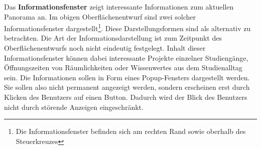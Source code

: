 Das \textbf{Informationsfenster} zeigt interessante Informationen zum aktuellen
Panorama an. Im obigen Oberflächenentwurf sind zwei solcher Informationsfenster
dargestellt\footnote{Die Informationsfenster befinden sich am rechten Rand
sowie oberhalb des Steuerkreuzes}. Diese Darstellungsformen sind als alternativ
zu betrachten. Die Art der Informationsdarstellung ist zum Zeitpunkt des
Oberflächenentwurfs noch nicht eindeutig festgelegt. Inhalt dieser
Informationsfenster können dabei interessante Projekte einzelner Studiengänge,
Öffnungszeiten von Räumlichkeiten oder Wissenwertes aus dem Studienalltag sein.
Die Informationen sollen in Form eines Popup-Fensters dargestellt werden. Sie
sollen also nicht permanent angezeigt werden, sondern erscheinen erst durch
Klicken des Benutzers auf einen Button. Dadurch wird der Blick des Benutzers
nicht durch störende Anzeigen eingeschränkt.
